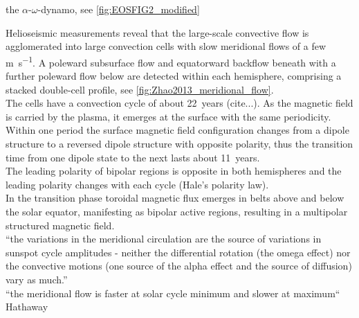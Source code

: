the $\alpha$-$\omega$-dynamo, see \autoref{fig:EOSFIG2_modified}\\
\begin{figure}[htb]
\end{figure}

Helioseismic measurements reveal that the large-scale convective flow is agglomerated into large convection cells with slow meridional flows of a few \si{\m\per\s}. A poleward subsurface flow and equatorward backflow beneath with a further poleward flow below are detected within each hemisphere, comprising a stacked double-cell profile, see \autoref{fig:Zhao2013_meridional_flow}.\\

The cells have a convection cycle of about 22~years (cite...). As the magnetic field is carried by the plasma, it emerges at the surface with the same periodicity. Within one period the surface magnetic field configuration changes from a dipole structure to a reversed dipole structure with opposite polarity, thus the transition time from one dipole state to the next lasts about 11~years.\\

The leading polarity of bipolar regions is opposite in both hemispheres and the leading polarity changes with each cycle (Hale's polarity law).\\



In the transition phase toroidal magnetic flux emerges in belts above and below the solar equator, manifesting as bipolar active regions, resulting in a multipolar structured magnetic field.\\

``the variations in the meridional circulation are the source of variations in sunspot cycle amplitudes - neither the differential rotation (the omega effect) nor the convective motions (one source of the alpha effect and the source of diffusion) vary as much.''\\
``the meridional flow is faster at solar cycle minimum and slower at maximum`` Hathaway\\



